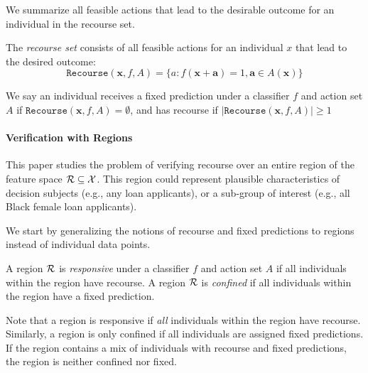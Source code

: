 We summarize all feasible actions that lead to the desirable outcome for an individual in the recourse set.
\begin{definition}
The \emph{recourse set} consists of all feasible actions for an individual $x$ that lead to the desired outcome:%
$$\mathtt{Recourse}(\mathbf{x}, f, A) = \{a: f(\mathbf{x} + \mathbf{a}) = 1, \mathbf{a} \in A(\mathbf{x})\}$$
\end{definition}

We say an individual receives a fixed prediction under a classifier $f$ and action set $A$ if $\mathtt{Recourse}(\mathbf{x}, f, A) = \emptyset$, and has recourse if $|\mathtt{Recourse}(\mathbf{x}, f, A)| \geq 1$


\paragraph{Verification with Regions} This paper studies the problem of verifying recourse over an entire region of the feature space ${\cal R} \subseteq {\cal X}$. This region could represent plausible characteristics of decision subjects (e.g., any loan applicants), or a sub-group of interest (e.g., all Black female loan applicants). 

We start by generalizing the notions of recourse and fixed predictions to regions instead of individual data points.

\begin{definition}
A region ${\cal R}$ is \emph{responsive} under a classifier $f$ and action set $A$ if all individuals within the region have recourse. A region ${\cal R}$ is \emph{confined} if all individuals within the region have a fixed prediction. %
\end{definition}
Note that a region is responsive if \emph{all} individuals within the region have recourse. Similarly, a region is only confined if all individuals are assigned fixed predictions.  If the region contains a mix of individuals with recourse and fixed predictions, the region is neither confined nor fixed.


